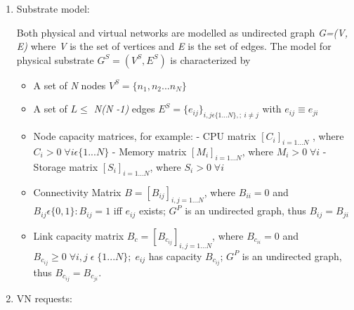 \documentclass[article,dr=phil,type=msc ,colorback,accentcolor=tud4b]{tudthesis}
\begin{document}
\begin{enumerate}[label=(\Alph*)]
	\item  Substrate model: \label{sub_model}
	
	Both physical and virtual networks are modelled as undirected graph \textit{G=(V, E)} where \textit{V} is the set of vertices and \textit{E} is the set of edges. 
	The model for physical substrate \textit{$G^{S}= (V^{S}, E^{S})$} is characterized by 
	\begin{itemize}
		\item A set of  \textit{N} nodes \textit{$V^{S}=\{n_{1}, n_{2}...n_{N}\}$}
		\item A set of \textit{$L \leq$ N(N -1)} edges \textit{$E^{S}=\{e_{ij}\}_{i,j \epsilon \{1...N\}, ;\ i \ne j}$} with \textit{$e_{ij}\equiv e_{ji}$}
		\item  Node capacity matrices, for example:\newline
		- CPU matrix $[C_{i}]_{i=1...N}$ , where $C_{i}>0 \; \forall i \epsilon \{1...N\}$ \newline
		- Memory matrix $[M_{i}]_{i=1...N}$, where $M_{i}>0 \; \forall i$ \newline
		- Storage matrix $[S_{i}]_{i=1...N}$, where $S_{i}>0 \; \forall i$ 
		\item Connectivity Matrix $B = [B_{ij}]_{i,j=1...N}$, where $B_{ii} =0$ and $B_{ij} \epsilon \{0, 1\} : B_{ij} =1$ iff $e_{ij}$ exists; $G^{P}$ is an undirected graph, thus $B_{ij} = B_{ji}$
		\item Link capacity matrix $B_{c} = [B_{c_{ij}}]_{i,j=1...N}$, where $B_{c_{ii}} = 0$ and $B_{c_{ij}} \geq 0 \; \forall i,j\;\epsilon \;\{1...N\}; \;e_{ij}$ has capacity $B_{c_{ij}}$; $G^{P}$ is an undirected graph, thus $B_{c_{ij}} = B_{c_{ji}}$.
	\end{itemize}
	
	\item   VN requests:  \label{vn_req}
	

\end{enumerate}
\end{document}
